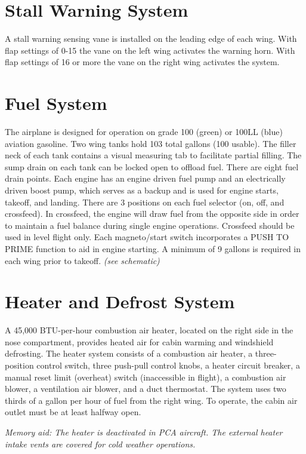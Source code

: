 {\section{Stall Warning System}

A stall warning sensing vane is installed on the leading edge of each wing. With flap settings of 0-15\degree{} the vane on
the left wing activates the warning horn. With flap settings of 16\degree{} or more the vane on the right wing activates the
system.

\section{Fuel System}

The airplane is designed for operation on grade 100 (green) or 100LL (blue) aviation gasoline. Two wing tanks hold
103 total gallons (100 usable). The filler neck of each tank contains a visual measuring tab to facilitate partial
filling. The sump drain on each tank can be locked open to offload fuel. There are eight fuel drain points. Each
engine has an engine driven fuel pump and an electrically driven boost pump, which serves as a backup and is used
for engine starts, takeoff, and landing. There are 3 positions on each fuel selector (on, off, and crossfeed). In
crossfeed, the engine will draw fuel from the opposite side in order to maintain a fuel balance during single engine
operations. Crossfeed should be used in level flight only. Each magneto/start switch incorporates a PUSH TO
PRIME function to aid in engine starting. A minimum of 9 gallons is required in each wing prior to takeoff.
\emph{(see schematic)}

\section{Heater and Defrost System}

A 45,000 BTU-per-hour combustion air heater, located on the right side in the nose compartment, provides heated
air for cabin warming and windshield defrosting. The heater system consists of a combustion air heater, a three-
position control switch, three push-pull control knobs, a heater circuit breaker, a manual reset limit (overheat) switch
(inaccessible in flight), a combustion air blower, a ventilation air blower, and a duct thermostat. The system uses
two thirds of a gallon per hour of fuel from the right wing. To operate, the cabin air outlet must be at least halfway
open.

\emph{Memory aid: The heater is deactivated in PCA aircraft. The external heater intake vents are covered for cold weather operations.}

}
